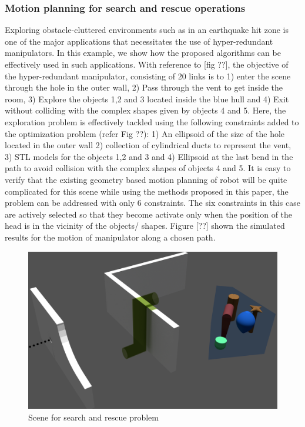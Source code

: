 \documentclass[12pt,a4]{article}
\begin{document}
\subsubsection{Motion planning for search and rescue operations}
Exploring obstacle-cluttered environments such as in an earthquake hit zone is one of the major applications that necessitates the use of hyper-redundant manipulators. In this example, we show how the proposed algorithms can be effectively used in such applications. With reference to [fig ??], the objective of the hyper-redundant manipulator, consisting of 20 links is to 1) enter the scene through the hole in the outer wall, 2) Pass through the vent to get inside the room, 3) Explore the objects 1,2 and 3 located inside the blue hull and 4) Exit without colliding with the complex shapes given by objects 4 and 5. Here, the exploration problem is effectively tackled using the following constraints added to the optimization problem (refer Fig ??): 1) An ellipsoid of the size of the hole located in the outer wall 2) collection of cylindrical ducts to represent the vent, 3) STL models for the objects 1,2 and 3 and 4) Ellipsoid at the last bend in the path to avoid collision with the complex shapes of objects 4 and 5. It is easy to verify that the existing geometry based motion planning of robot will be quite complicated for this scene while using the methods proposed in this paper, the problem can be addressed with only 6 constraints. The six constraints in this case are actively selected so that they become activate only when the position of the head is in the vicinity of the objects/ shapes. Figure [??] shown the simulated results for the motion of manipulator along a chosen path. 

\begin{figure}[h!]
\centering
\includegraphics[scale=0.2]{figures/figscene.png}
\caption{ Scene for search and rescue problem\label{fig:scene}}
\end{figure}
\end{document}
